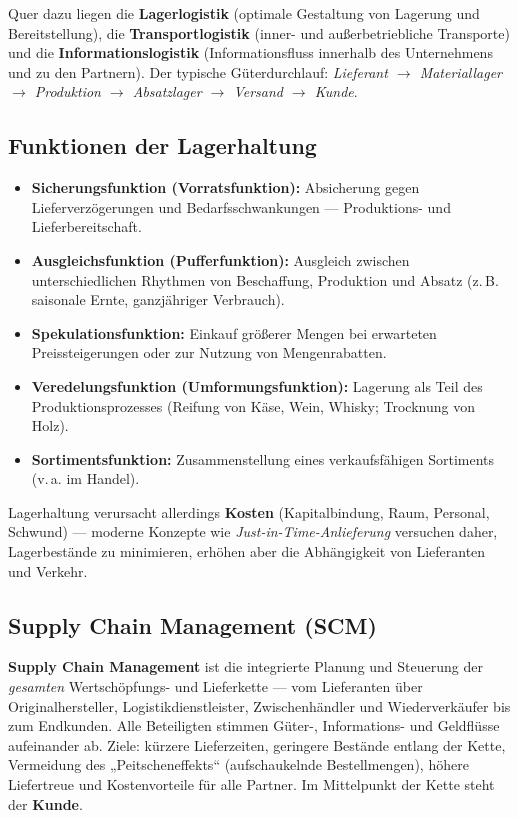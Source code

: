 \documentclass[11pt, a4paper]{article}
\begin{document}
Quer dazu liegen die \textbf{Lagerlogistik} (optimale Gestaltung von Lagerung und
Bereitstellung), die \textbf{Transportlogistik} (inner- und außerbetriebliche
Transporte) und die \textbf{Informationslogistik} (Informationsfluss innerhalb des
Unternehmens und zu den Partnern). Der typische Güterdurchlauf: \emph{Lieferant
$\rightarrow$ Materiallager $\rightarrow$ Produktion $\rightarrow$ Absatzlager
$\rightarrow$ Versand $\rightarrow$ Kunde}.

\subsection{Funktionen der Lagerhaltung}

\begin{itemize}
  \item \textbf{Sicherungsfunktion (Vorratsfunktion):} Absicherung gegen
    Lieferverzögerungen und Bedarfsschwankungen --- Produktions- und Lieferbereitschaft.
  \item \textbf{Ausgleichsfunktion (Pufferfunktion):} Ausgleich zwischen unterschiedlichen
    Rhythmen von Beschaffung, Produktion und Absatz (z.\,B. saisonale Ernte, ganzjähriger
    Verbrauch).
  \item \textbf{Spekulationsfunktion:} Einkauf größerer Mengen bei erwarteten
    Preissteigerungen oder zur Nutzung von Mengenrabatten.
  \item \textbf{Veredelungsfunktion (Umformungsfunktion):} Lagerung als Teil des
    Produktionsprozesses (Reifung von Käse, Wein, Whisky; Trocknung von Holz).
  \item \textbf{Sortimentsfunktion:} Zusammenstellung eines verkaufsfähigen Sortiments
    (v.\,a. im Handel).
\end{itemize}

Lagerhaltung verursacht allerdings \textbf{Kosten} (Kapitalbindung, Raum, Personal,
Schwund) --- moderne Konzepte wie \emph{Just-in-Time-Anlieferung} versuchen daher,
Lagerbestände zu minimieren, erhöhen aber die Abhängigkeit von Lieferanten und Verkehr.

\subsection{Supply Chain Management (SCM)}

\textbf{Supply Chain Management} ist die integrierte Planung und Steuerung der
\emph{gesamten} Wertschöpfungs- und Lieferkette --- vom Lieferanten über Originalhersteller,
Logistikdienstleister, Zwischenhändler und Wiederverkäufer bis zum Endkunden. Alle
Beteiligten stimmen Güter-, Informations- und Geldflüsse aufeinander ab. Ziele: kürzere
Lieferzeiten, geringere Bestände entlang der Kette, Vermeidung des „Peitscheneffekts``
(aufschaukelnde Bestellmengen), höhere Liefertreue und Kostenvorteile für alle Partner.
Im Mittelpunkt der Kette steht der \textbf{Kunde}.
\end{document}
